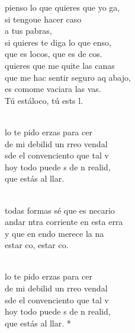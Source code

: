 \documentclass[12pt]{article}
\begin{document}
\begin{multicols*}{2}
\begin{cancion}%
	 pienso lo que quieres que yo ga,\\
	si tengoue hacer caso \\
	a tus pabras,\\
	si quieres te diga lo que enso,\\
	que es  locos, que es de cos.\\
\jump
	 quieres que me quite las canas\\
	que me hac sentir seguro aq abajo, \\
	es comome vaciara las vas.\\
	Tú estáloco, tú ests l.\\\jump\\
	\begin{chorus}%
	lo te pido erzas para cer \\
	de mi debilid un rreo vendal\\
	sde el convenciento que tal v\\
	hoy todo puede s de n realid,\\
	que  estás al llar.  \\
	\end{chorus}%
	\jump\\
	 todas formas sé que es necario\\
	andar ntra corriente en esta erra\\
	y que en endo merece la na\\
	estar co, estar co.\\\jump\\
	\begin{chorus}%
	lo te pido erzas para cer \\
	de mi debilid un rreo vendal\\
	sde el convenciento que tal v\\
	hoy todo puede s de n realid,\\
	que  estás al llar. *\\
	\end{chorus}%
	\jump\\
\end{cancion}%


\end{multicols*}
\end{document}

